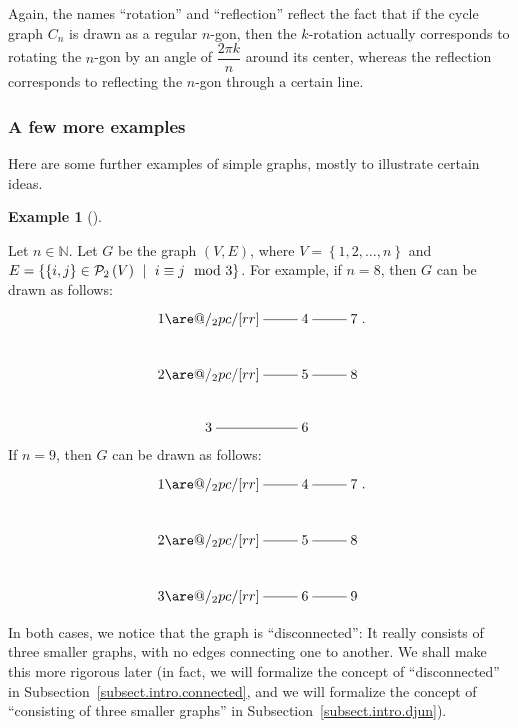 \documentclass[numbers=enddot,12pt,final,onecolumn,notitlepage]{scrartcl}%
\makeatletter
\theoremstyle{definition}
\newtheorem{exam}[theo]{Example}
\newenvironment{example}[1][]
{\begin{exam}[#1]\begin{leftbar}}
{\end{leftbar}\end{exam}}
\newcommand{\NN}{\mathbb{N}}
\newcommand{\powset}[2][]{\ifthenelse{\equal{#2}{}}{\mathcal{P}\left(#1\right)}{\mathcal{P}_{#1}\left(#2\right)}}
\newcommand{\set}[1]{\left\{ #1 \right\}}
\newcommand{\tup}[1]{\left( #1 \right)}
\newcommand{\are}{\ar@{-}}
\makeatother
\begin{document}
Again, the names ``rotation'' and ``reflection'' reflect the
fact that if the cycle graph $C_n$ is drawn as a regular $n$-gon,
then the $k$-rotation actually corresponds to rotating the $n$-gon
by an angle of $\dfrac{2\pi k}{n}$ around its center, whereas the
reflection corresponds to reflecting the $n$-gon through a certain
line.

\subsubsection{A few more examples}

Here are some further examples of simple graphs, mostly to illustrate
certain ideas.

\begin{example} \label{exa.intro.discon-graph}
Let $n \in \NN$. Let $G$ be the graph $\tup{V, E}$, where
$V = \set{1, 2, \ldots, n}$ and
$E = \set{ \set{i, j} \in \powset[2]{V} \ \mid
           \  i \equiv j \mod 3 }$.
For example, if $n = 8$, then $G$ can be drawn as follows:
\begin{align*}
\xymatrix{
1 \are@/_2pc/[rr] \are[r] & 4 \are[r] & 7 \\
2 \are@/_2pc/[rr] \are[r] & 5 \are[r] & 8 \\
3 \are[r] & 6
} .
\end{align*}
If $n = 9$, then $G$ can be drawn as follows:
\begin{align*}
\xymatrix{
1 \are@/_2pc/[rr] \are[r] & 4 \are[r] & 7 \\
2 \are@/_2pc/[rr] \are[r] & 5 \are[r] & 8 \\
3 \are@/_2pc/[rr] \are[r] & 6 \are[r] & 9
} .
\end{align*}
\vspace{0.6pc}
\par
In both cases, we notice that the graph is ``disconnected'': It
really consists of three smaller graphs, with no edges connecting one
to another. We shall make this more rigorous later (in fact, we will
formalize the concept of ``disconnected'' in
Subsection~\ref{subsect.intro.connected}, and we will formalize the
concept of ``consisting of three smaller graphs'' in
Subsection~\ref{subsect.intro.djun}).
\end{example}
\end{document}
